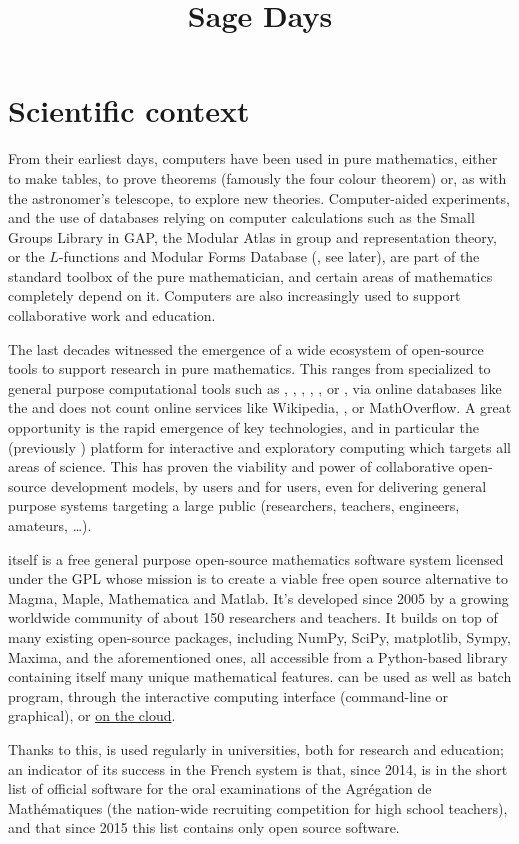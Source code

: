 \documentclass[12pt]{amsbook}
\begin{document}
\title{Sage Days}

\section{Scientific context}


From their earliest days, computers have been used in pure
mathematics, either to make tables, to prove theorems (famously the
four colour theorem) or, as with the astronomer's telescope, to
explore new theories. Computer-aided experiments, and the use of
databases relying on computer calculations such as the Small Groups
Library in GAP, the Modular Atlas in group and representation theory,
or the $L$-functions and Modular Forms Database (\LMFDB, see later),
are part of the standard toolbox of the pure mathematician, and
certain areas of mathematics completely depend on it. Computers are
also increasingly used to support collaborative work and education.

The last decades witnessed the emergence of a wide ecosystem of
open-source tools to support research in pure mathematics. This ranges
from specialized to general purpose computational tools such as \GAP,
\PariGP, \Linbox, \MPIR, \Sage, or \Singular, via online databases
like the \LMFDB and does not count online services like Wikipedia,
\Arxiv, or MathOverflow. A great opportunity is the rapid emergence of
key technologies, and in particular the \Jupyter (previously \IPython)
platform for interactive and exploratory computing which targets all
areas of science. This has proven the viability and power of
collaborative open-source development models, by users and for users,
even for delivering general purpose systems targeting a large public
(researchers, teachers, engineers, amateurs, \ldots).

\Sage itself is a free general purpose open-source mathematics
software system licensed under the GPL whose mission is to create a
viable free open source alternative to Magma, Maple, Mathematica and
Matlab. It's developed since 2005 by a growing worldwide community of
about 150 researchers and teachers. It builds on top of many existing
open-source packages, including NumPy, SciPy, matplotlib, Sympy,
Maxima, and the aforementioned ones, all accessible from a
Python-based library containing itself many unique mathematical
features. \Sage can be used as well as batch program, through the
\Jupyter interactive computing interface (command-line or graphical),
or \href{cloud.sagemath.org}{on the cloud}.

Thanks to this, \Sage is used regularly in universities, both for
research and education; an indicator of its success in the French
system is that, since 2014, \Sage is in the short list of official
software for the oral examinations of the Agrégation de Mathématiques
(the nation-wide recruiting competition for high school teachers), and
that since 2015 this list contains only open source software.
\end{document}

